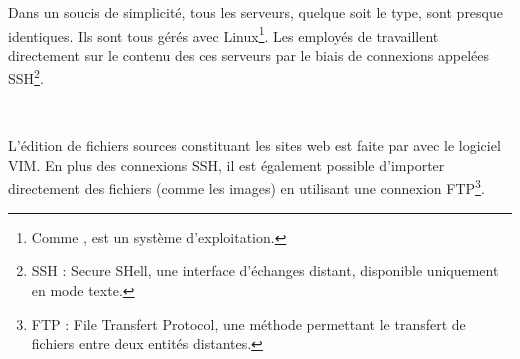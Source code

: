 Dans un soucis de simplicité, tous les serveurs, quelque soit le type, sont presque identiques. Ils sont tous gérés avec Linux\footnote{Comme ,  est un système d'exploitation.}.
Les employés de \fidit{} travaillent directement sur le contenu des ces serveurs par le biais de connexions appelées SSH\footnote{SSH : Secure SHell, une interface d'échanges distant, disponible uniquement en mode texte.}.

~

L'édition de fichiers sources constituant les sites web est faite par avec le logiciel VIM. En plus des connexions SSH, il est également possible d'importer directement des fichiers (comme les images) en utilisant une connexion FTP\footnote{FTP : File Transfert Protocol, une méthode permettant le transfert de fichiers entre deux entités distantes.}.
